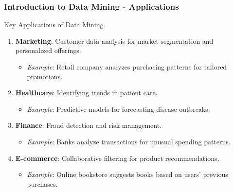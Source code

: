 \documentclass[aspectratio=169]{beamer}
\begin{document}
\begin{frame}[fragile]
    \frametitle{Introduction to Data Mining - Applications}
    \begin{block}{Key Applications of Data Mining}
        \begin{enumerate}
            \item \textbf{Marketing}: Customer data analysis for market segmentation and personalized offerings.
                \begin{itemize}
                    \item \textit{Example}: Retail company analyzes purchasing patterns for tailored promotions.
                \end{itemize}
            \item \textbf{Healthcare}: Identifying trends in patient care.
                \begin{itemize}
                    \item \textit{Example}: Predictive models for forecasting disease outbreaks.
                \end{itemize}
            \item \textbf{Finance}: Fraud detection and risk management.
                \begin{itemize}
                    \item \textit{Example}: Banks analyze transactions for unusual spending patterns.
                \end{itemize}
            \item \textbf{E-commerce}: Collaborative filtering for product recommendations.
                \begin{itemize}
                    \item \textit{Example}: Online bookstore suggests books based on users' previous purchases.
                \end{itemize}
        \end{enumerate}
    \end{block}
\end{frame}
\end{document}
